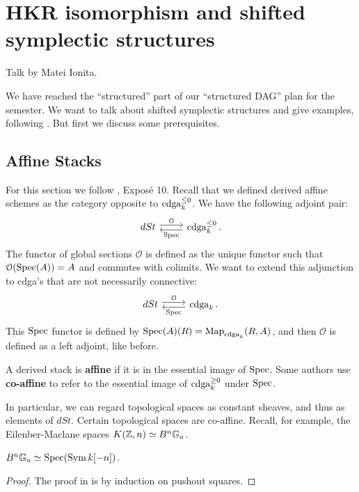 \chapter{HKR isomorphism and shifted symplectic structures}
Talk by Matei Ionita.

We have reached the ``structured'' part of our ``structured DAG'' plan for the semester. We want to talk about shifted
symplectic structures and give examples, following \cite{PTVV}. But first we discuss some prerequisites.

\section{Affine Stacks}
For this section we follow \cite{vezzosi2013autour}, Expos\'e 10. Recall that we defined derived affine schemes as
the category opposite to $\operatorname{cdga}_k^{\leq 0}$. We have the following adjoint pair:
\[
\begin{tikzcd}
dSt \arrow[shift left]{r}{\mathcal{O}} & \cdga_k^{\leq 0} \arrow[shift left]{l}{\Spec} .
\end{tikzcd}
\]
The functor of global sections $\mathcal{O}$ is defined as the unique functor such that $\mathcal{O}(\operatorname{Spec}(A)) = A$ and
commutes with colimits. We want to extend this adjunction to cdga's that are not necessarily connective:
\[
\begin{tikzcd}
dSt \arrow[shift left]{r}{\mathcal{O}} & \cdga_k \arrow[shift left]{l}{\Spec} .
\end{tikzcd}
\]
This $\operatorname{Spec}$ functor is defined by $\operatorname{Spec}(A)(R) = \operatorname{Map}_{\operatorname{cdga}_k}(R,A)$, and then $\mathcal{O}$ is defined as a left adjoint,
like before.

\begin{defin}
A derived stack is \textbf{affine} if it is in the essential image of $\operatorname{Spec}$. Some authors use \textbf{co-affine}
to refer to the essential image of $\operatorname{cdga}_k^{\geq 0}$ under $\operatorname{Spec}$.
\end{defin}

In particular, we can regard topological spaces as constant sheaves, and thus as elements of $dSt$. Certain topological
spaces are co-affine. Recall, for example, the Eilenber-Maclane spaces $K(\mathbb Z,n) \simeq B^n\mathbb G_a$.

\begin{prop}
$B^n\mathbb G_a \simeq \operatorname{Spec}(\operatorname{Sym} k[-n])$.
\end{prop}
\begin{proof}
The proof in \cite{vezzosi2013autour} is by induction on pushout squares.
\end{proof}

